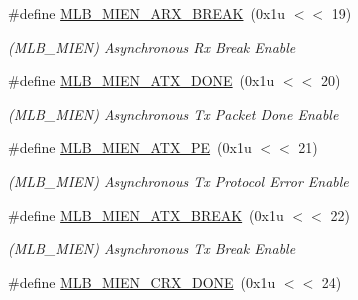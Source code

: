 \begin{DoxyCompactItemize}
\mbox{\label{group__SAMV71__MLB_gaf3361713903597fd94dfb2776441ee2c}} 
\#define \mbox{\hyperlink{group__SAMV71__MLB_gaf3361713903597fd94dfb2776441ee2c}{M\+L\+B\+\_\+\+M\+I\+E\+N\+\_\+\+A\+R\+X\+\_\+\+B\+R\+E\+AK}}~(0x1u $<$$<$ 19)
\begin{DoxyCompactList}\small\item\em (M\+L\+B\+\_\+\+M\+I\+EN) Asynchronous Rx Break Enable \end{DoxyCompactList}\item 
\mbox{\label{group__SAMV71__MLB_ga2d123d399ce9c58b5dac1d14b5a5b6ae}} 
\#define \mbox{\hyperlink{group__SAMV71__MLB_ga2d123d399ce9c58b5dac1d14b5a5b6ae}{M\+L\+B\+\_\+\+M\+I\+E\+N\+\_\+\+A\+T\+X\+\_\+\+D\+O\+NE}}~(0x1u $<$$<$ 20)
\begin{DoxyCompactList}\small\item\em (M\+L\+B\+\_\+\+M\+I\+EN) Asynchronous Tx Packet Done Enable \end{DoxyCompactList}\item 
\mbox{\label{group__SAMV71__MLB_gac51424fea766cba84bd30cad95f1d268}} 
\#define \mbox{\hyperlink{group__SAMV71__MLB_gac51424fea766cba84bd30cad95f1d268}{M\+L\+B\+\_\+\+M\+I\+E\+N\+\_\+\+A\+T\+X\+\_\+\+PE}}~(0x1u $<$$<$ 21)
\begin{DoxyCompactList}\small\item\em (M\+L\+B\+\_\+\+M\+I\+EN) Asynchronous Tx Protocol Error Enable \end{DoxyCompactList}\item 
\mbox{\label{group__SAMV71__MLB_gab2f673f0fd6addf013cad34a8398c8ae}} 
\#define \mbox{\hyperlink{group__SAMV71__MLB_gab2f673f0fd6addf013cad34a8398c8ae}{M\+L\+B\+\_\+\+M\+I\+E\+N\+\_\+\+A\+T\+X\+\_\+\+B\+R\+E\+AK}}~(0x1u $<$$<$ 22)
\begin{DoxyCompactList}\small\item\em (M\+L\+B\+\_\+\+M\+I\+EN) Asynchronous Tx Break Enable \end{DoxyCompactList}\item 
\mbox{\label{group__SAMV71__MLB_gaf30b151973ad0a3def1686602380ab99}} 
\#define \mbox{\hyperlink{group__SAMV71__MLB_gaf30b151973ad0a3def1686602380ab99}{M\+L\+B\+\_\+\+M\+I\+E\+N\+\_\+\+C\+R\+X\+\_\+\+D\+O\+NE}}~(0x1u $<$$<$ 24)
$$
\end{DoxyCompactItemize}
